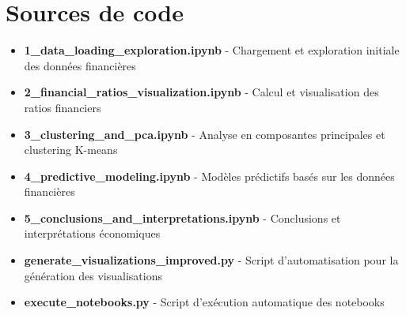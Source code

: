 \documentclass[11pt]{report}
\begin{document}
\chapter*{Sources de code}
\begin{itemize}
    \item \textbf{1\_data\_loading\_exploration.ipynb} - Chargement et exploration initiale des données financières
    \item \textbf{2\_financial\_ratios\_visualization.ipynb} - Calcul et visualisation des ratios financiers
    \item \textbf{3\_clustering\_and\_pca.ipynb} - Analyse en composantes principales et clustering K-means
    \item \textbf{4\_predictive\_modeling.ipynb} - Modèles prédictifs basés sur les données financières
    \item \textbf{5\_conclusions\_and\_interpretations.ipynb} - Conclusions et interprétations économiques 
    \item \textbf{generate\_visualizations\_improved.py} - Script d'automatisation pour la génération des visualisations
    \item \textbf{execute\_notebooks.py} - Script d'exécution automatique des notebooks
\end{itemize}
\end{document}
